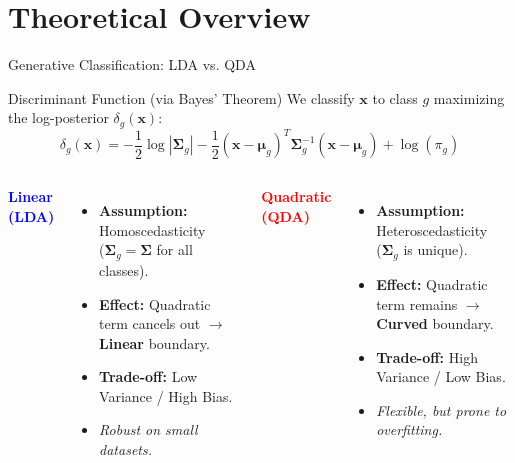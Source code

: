 \documentclass[aspectratio=169,xcolor=dvipsnames]{beamer}
\begin{document}
\section{Theoretical Overview}

\begin{frame}{Generative Classification: LDA vs. QDA}
    
    \begin{block}{Discriminant Function (via Bayes' Theorem)}
        We classify $\mathbf{x}$ to class $g$ maximizing the log-posterior $\delta_g(\mathbf{x})$:
        \[ \delta_g(\mathbf{x}) = -\frac{1}{2}\log|\boldsymbol{\Sigma}_g| - \frac{1}{2}(\mathbf{x}-\boldsymbol{\mu}_g)^T \boldsymbol{\Sigma}_g^{-1} (\mathbf{x}-\boldsymbol{\mu}_g) + \log(\pi_g) \]
    \end{block}

    \vspace{0.5em}

    \begin{columns}[t]
        \textbf{\textcolor{blue}{Linear (LDA)}}
        \begin{itemize}
            \item \textbf{Assumption:} Homoscedasticity \\ ($\boldsymbol{\Sigma}_g = \boldsymbol{\Sigma}$ for all classes).
            \item \textbf{Effect:} Quadratic term cancels out $\to$ \textbf{Linear} boundary.
            \item \textbf{Trade-off:} Low Variance / High Bias.
            \item \textit{Robust on small datasets.}
        \end{itemize}

        \textbf{\textcolor{red}{Quadratic (QDA)}}
        \begin{itemize}
            \item \textbf{Assumption:} Heteroscedasticity \\ ($\boldsymbol{\Sigma}_g$ is unique).
            \item \textbf{Effect:} Quadratic term remains $\to$ \textbf{Curved} boundary.
            \item \textbf{Trade-off:} High Variance / Low Bias.
            \item \textit{Flexible, but prone to overfitting.}
        \end{itemize}
    \end{columns}
\end{frame}
\end{document}
